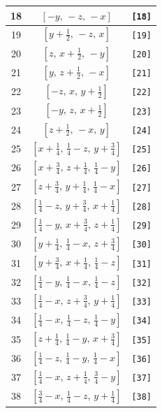 \documentclass[fleqn,8pt]{jsarticle}
\begin{document}
\begin{longtable}{ccc}
18 & $\left[ - y,\, - z,\, - x \right]$ & {\tt [18]} \\ \hline
19 & $\left[ y + \frac{1}{2},\, - z,\, x \right]$ & {\tt [19]} \\ \hline
20 & $\left[ z,\, x + \frac{1}{2},\, - y \right]$ & {\tt [20]} \\ \hline
21 & $\left[ y,\, z + \frac{1}{2},\, - x \right]$ & {\tt [21]} \\ \hline
22 & $\left[ - z,\, x,\, y + \frac{1}{2} \right]$ & {\tt [22]} \\ \hline
23 & $\left[ - y,\, z,\, x + \frac{1}{2} \right]$ & {\tt [23]} \\ \hline
24 & $\left[ z + \frac{1}{2},\, - x,\, y \right]$ & {\tt [24]} \\ \hline
25 & $\left[ x + \frac{1}{4},\, \frac{1}{4} - z,\, y + \frac{3}{4} \right]$ & {\tt [25]} \\ \hline
26 & $\left[ x + \frac{3}{4},\, z + \frac{1}{4},\, \frac{1}{4} - y \right]$ & {\tt [26]} \\ \hline
27 & $\left[ z + \frac{3}{4},\, y + \frac{1}{4},\, \frac{1}{4} - x \right]$ & {\tt [27]} \\ \hline
28 & $\left[ \frac{1}{4} - z,\, y + \frac{3}{4},\, x + \frac{1}{4} \right]$ & {\tt [28]} \\ \hline
29 & $\left[ \frac{1}{4} - y,\, x + \frac{3}{4},\, z + \frac{1}{4} \right]$ & {\tt [29]} \\ \hline
30 & $\left[ y + \frac{1}{4},\, \frac{1}{4} - x,\, z + \frac{3}{4} \right]$ & {\tt [30]} \\ \hline
31 & $\left[ y + \frac{3}{4},\, x + \frac{1}{4},\, \frac{1}{4} - z \right]$ & {\tt [31]} \\ \hline
32 & $\left[ \frac{1}{4} - y,\, \frac{1}{4} - x,\, \frac{1}{4} - z \right]$ & {\tt [32]} \\ \hline
33 & $\left[ \frac{1}{4} - x,\, z + \frac{3}{4},\, y + \frac{1}{4} \right]$ & {\tt [33]} \\ \hline
34 & $\left[ \frac{1}{4} - x,\, \frac{1}{4} - z,\, \frac{1}{4} - y \right]$ & {\tt [34]} \\ \hline
35 & $\left[ z + \frac{1}{4},\, \frac{1}{4} - y,\, x + \frac{3}{4} \right]$ & {\tt [35]} \\ \hline
36 & $\left[ \frac{1}{4} - z,\, \frac{1}{4} - y,\, \frac{1}{4} - x \right]$ & {\tt [36]} \\ \hline
37 & $\left[ \frac{1}{4} - x,\, z + \frac{1}{4},\, \frac{3}{4} - y \right]$ & {\tt [37]} \\ \hline
38 & $\left[ \frac{3}{4} - x,\, \frac{1}{4} - z,\, y + \frac{1}{4} \right]$ & {\tt [38]} \\ \hline

\end{longtable}
\end{document}
